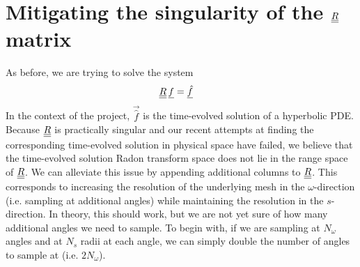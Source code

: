 
\section*{Mitigating the singularity of the ${\underline{\underline{R}}}$ matrix}
As before, we are trying to solve the system
\begin{align*}
	{\underline{\underline{R}}} \, {\underline{f}} & = {\underline{\hat{f}}}
\end{align*}
In the context of the project, $\vec{\hat{f}}$ is the time-evolved solution of a hyperbolic PDE.
Because ${\underline{\underline{R}}}$ is practically singular and our recent attempts at finding the corresponding time-evolved solution in physical space have failed, we believe that the time-evolved solution Radon transform space does not lie in the range space of ${\underline{\underline{R}}}$.
We can alleviate this issue by appending additional columns to ${\underline{\underline{R}}}$.
This corresponds to increasing the resolution of the underlying mesh in the $\omega$-direction (i.e. sampling at additional angles) while maintaining the resolution in the $s$-direction. 
In theory, this should work, but we are not yet sure of how many additional angles we need to sample.
To begin with, if we are sampling at $N_{\omega}$ angles and at $N_{s}$ radii at each angle, we can simply double the number of angles to sample at (i.e. $2 N_{\omega}$).